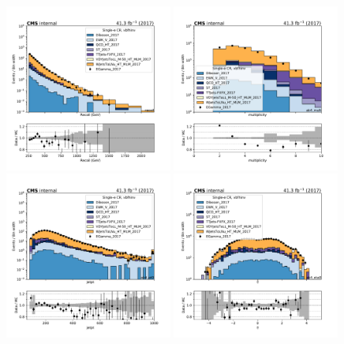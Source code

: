 {\begin{figure}[htbp]
    \begin{center}
        \includegraphics[width=0.49\textwidth]{fig/datamc/cr_1e_vbf/cr_1e_vbf_recoil_losf_2017.pdf}
        \includegraphics[width=0.49\textwidth]{fig/datamc/cr_1e_vbf/cr_1e_vbf_ak4_mult_losf_2017.pdf} \\
        \includegraphics[width=0.49\textwidth]{fig/datamc/cr_1e_vbf/cr_1e_vbf_ak4_pt0_losf_2017.pdf}
        \includegraphics[width=0.49\textwidth]{fig/datamc/cr_1e_vbf/cr_1e_vbf_ak4_eta0_losf_2017.pdf}

\end{center}
\end{figure}}
